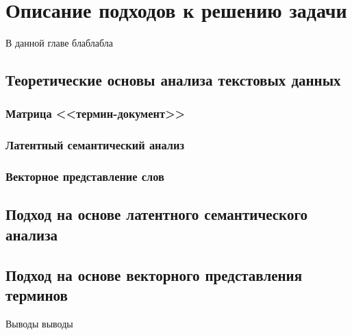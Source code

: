 \chapter{Описание подходов к решению задачи}

В данной главе блаблабла

\section{Теоретические основы анализа текстовых данных}

\subsection{Матрица <<термин-документ>>}

\subsection{Латентный семантический анализ}

\subsection{Векторное представление слов}

\section{Подход на основе латентного семантического анализа}

\section{Подход на основе векторного представления терминов}

\chapterconclusion

Выводы выводы
